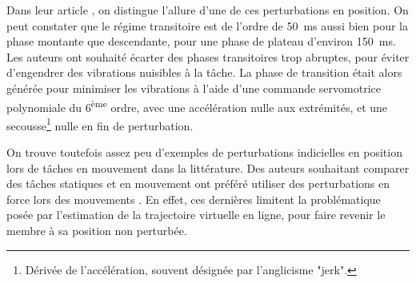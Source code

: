 Dans leur article \parencite{burdet_method_2000}, on distingue l'allure d'une de ces perturbations en position. On peut constater que le régime transitoire est de l'ordre de \SI{50}{\milli\second} aussi bien pour la phase montante que descendante, pour une phase de plateau d'environ \SI{150}{\milli\second}. Les auteurs ont souhaité écarter des phases transitoires trop abruptes, pour éviter d'engendrer des vibrations nuisibles à la tâche. La phase de transition était alors générée pour minimiser les vibrations à l'aide d'une commande servomotrice polynomiale du 6\textsuperscript{ème} ordre, avec une accélération nulle aux extrémités, et une secousse\footnote{Dérivée de l'accélération, souvent désignée par l'anglicisme "jerk".} nulle en fin de perturbation.

On trouve toutefois assez peu d'exemples de perturbations indicielles en position lors de tâches en mouvement dans la littérature. Des auteurs souhaitant comparer des tâches statiques et en mouvement ont préféré utiliser des perturbations en force lors des mouvements \parencite{gomi_human_1997}. En effet, ces dernières limitent la problématique posée par l'estimation de la trajectoire virtuelle en ligne, pour faire revenir le membre à sa position non perturbée.



